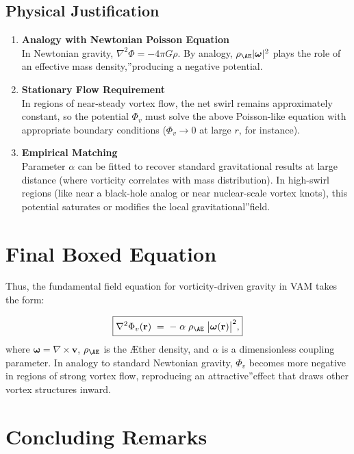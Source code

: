 \subsection{Physical Justification}
\begin{enumerate}
    \item \textbf{Analogy with Newtonian Poisson Equation} \\
    In Newtonian gravity, \(\nabla^2 \Phi = -4\pi G\rho\). By analogy, \(\rho_{\mathrm{\AE}}|\boldsymbol{\omega}|^2\) plays the role of an \grqq effective mass density,\textquotedblright producing a negative potential.
    \item \textbf{Stationary Flow Requirement} \\
    In regions of near-steady vortex flow, the net swirl remains approximately constant, so the potential \(\Phi_v\) must solve the above Poisson-like equation with appropriate boundary conditions (\(\Phi_v \to 0\) at large \(r\), for instance).
    \item \textbf{Empirical Matching} \\
    Parameter \(\alpha\) can be fitted to recover standard gravitational results at large distance (where vorticity correlates with mass distribution). In high-swirl regions (like near a black-hole analog or near nuclear-scale vortex knots), this potential saturates or modifies the local \grqq gravitational\textquotedblright field.
\end{enumerate}

\section{Final Boxed Equation}

Thus, the fundamental field equation for vorticity-driven gravity in VAM takes the form:

\[
    \boxed{
        \nabla^2 \Phi_v(\mathbf{r})
        \;=\;
        -\;\alpha\;\rho_{\mathrm{\AE}}\;\bigl|\boldsymbol{\omega}(\mathbf{r})\bigr|^2,
    }
\]
where \(\boldsymbol{\omega} = \nabla \times \mathbf{v}\), \(\rho_{\mathrm{\AE}}\) is the Æther density, and \(\alpha\) is a dimensionless coupling parameter. In analogy to standard Newtonian gravity, \(\Phi_v\) becomes more negative in regions of strong vortex flow, reproducing an \grqq attractive\textquotedblright effect that draws other vortex structures inward.

\section{Concluding Remarks}

